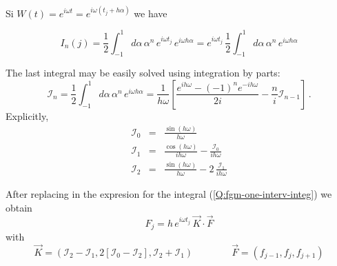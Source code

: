 Si $W(t)=e^{i \omega t}= e^{i \omega (t_{j}+h\alpha)}$ we have

\begin{equation}
  \label{Q:fgm-moment-expon}
  I_{n}(j)=\frac{1}{2} \int_{-1}^{1} d\alpha \, \alpha^{n} \, e^{i \omega t_{j}} \, e^{i \omega h \alpha} = e^{i \omega t_{j}} \,\frac{1}{2} \int_{-1}^{1} d\alpha \, \alpha^{n} \, e^{i \omega h \alpha}
\end{equation}

The last integral may be easily solved using integration by parts:
\begin{equation*}
  \mathcal{I}_{n}= \frac{1}{2}  \int_{-1}^{1} d\alpha \, \alpha^{n} \, e^{i \omega h \alpha} =
\frac{1}{h\omega} \left[ \frac{e^{ih\omega} - (-1)^{n}e^{-i h \omega}}{2i} - \frac{n}{i} \mathcal{I}_{n-1}\right] \,.
\end{equation*}
Explicitly,
\begin{eqnarray}\label{Q:fgm-moment-expon-1}
  \mathcal{I}_{0}&=& \frac{\sin(h\omega)}{h\omega} \\
  \mathcal{I}_{1}&=& \frac{\cos(h \omega)}{i h\omega} - \frac{\mathcal{I}_{0}}{i h\omega} \\
  \mathcal{I}_{2}&=& \frac{\sin(h \omega)}{h\omega} - 2\, \frac{\mathcal{I}_{1}}{i h\omega}
\end{eqnarray}

After replacing in the expresion for the integral (\ref{Q:fgm-one-interv-integ}) we obtain
\begin{equation}
\label{Q:fgm-f_j-expon}
  F_{j}= h \, e^{i \omega t_{j}} \, \vec{K} \cdot \vec{F}
\end{equation}
with 
\begin{equation}
  \label{Q:fgm-f_j-expon-expla}
  \vec{K}= (\mathcal{I}_{2} - \mathcal{I}_{1} , 2[\mathcal{I}_{0} - \mathcal{I}_{2}],  \mathcal{I}_{2} + \mathcal{I}_{1}) \qquad \qquad \vec{F}= (f_{j-1}, f_{j}, f_{j+1})
\end{equation}


